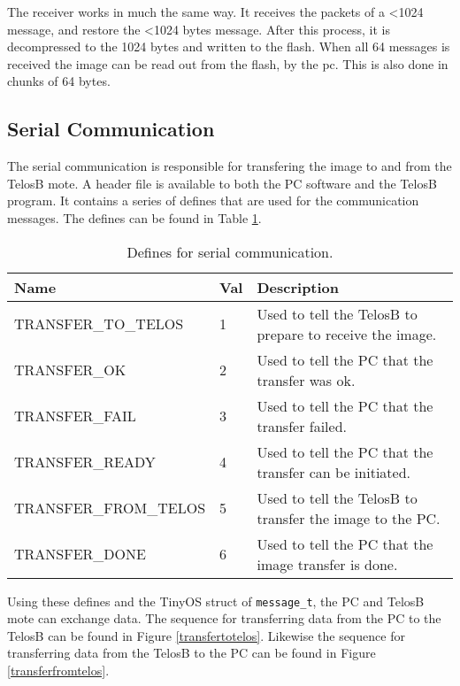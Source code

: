 The receiver works in much the same way. It receives the packets of a <1024 message, and restore the <1024 bytes message. After this process, it is decompressed to the 1024 bytes and written to the flash. When all 64 messages is received the image can be read out from the flash, by the pc. This is also done in chunks of 64 bytes. 

\subsection{Serial Communication}
\label{sec:Serial-Communication}
The serial communication is responsible for transfering the image to and from the TelosB mote. A header file is available to both the PC software and the TelosB program. It contains a series of defines that are used for the communication messages. The defines can be found in Table \ref{definetable}.
\begin{table}[H]
\centering
    \begin{tabular}{lll}
    \hline
    Name                  & Val & Description                                               \\ \hline
    \rowcolor{gr}
    TRANSFER\_TO\_TELOS   & 1     & Used to tell the TelosB to prepare to receive the image. \\ %
    TRANSFER\_OK          & 2     & Used to tell the PC that the transfer was ok.             \\ %
    \rowcolor{gr}
    TRANSFER\_FAIL        & 3     & Used to tell the PC that the transfer failed.             \\ %
    TRANSFER\_READY       & 4     & Used to tell the PC that the transfer can be initiated.   \\ %
    \rowcolor{gr}
    TRANSFER\_FROM\_TELOS & 5     & Used to tell the TelosB to transfer the image to the PC.  \\ %
    TRANSFER\_DONE        & 6     & Used to tell the PC that the image transfer is done.      \\ \hline
    \end{tabular}
    \caption{Defines for serial communication.}
    \label{definetable}
\end{table}

Using these defines and the TinyOS struct of \texttt{message\_t}, the PC and TelosB mote can exchange data. 
The sequence for transferring data from the PC to the TelosB can be found in Figure \ref{transfertotelos}. 
Likewise the sequence for transferring data from the TelosB to the PC can be found in Figure \ref{transferfromtelos}.

